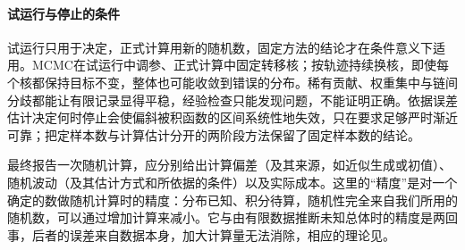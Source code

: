 \paragraph{试运行与停止的条件}
试运行只用于决定，正式计算用新的随机数，固定方法的结论才在条件意义下适用。MCMC在试运行中调参、正式计算中固定转移核；按轨迹持续换核，即使每个核都保持目标不变，整体也可能收敛到错误的分布。稀有贡献、权重集中与链间分歧都能让有限记录显得平稳，经验检查只能发现问题，不能证明正确。依据误差估计决定何时停止会使偏斜被积函数的区间系统性地失效，只在要求足够严时渐近可靠；把定样本数与计算估计分开的两阶段方法保留了固定样本数的结论。

最终报告一次随机计算，应分别给出计算偏差（及其来源，如近似生成或初值）、随机波动（及其估计方式和所依据的条件）以及实际成本。这里的“精度”是对一个确定的数做随机计算时的精度：分布已知、积分待算，随机性完全来自我们所用的随机数，可以通过增加计算来减小。它与由有限数据推断未知总体时的精度是两回事，后者的误差来自数据本身，加大计算量无法消除，相应的理论见。
